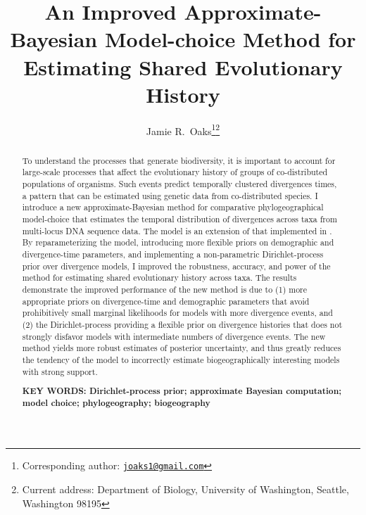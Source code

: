 \documentclass[letterpaper,12pt]{article}
\title{An Improved Approximate-Bayesian Model-choice Method for Estimating
Shared Evolutionary History}
\author[1]{Jamie R.\ Oaks\thanks{Corresponding author: \href{mailto:joaks1@gmail.com}{\tt joaks1@gmail.com}}\thanks{Current address: Department of Biology, University of Washington, Seattle, Washington 98195}}
\affil[1]{Department of Ecology and Evolutionary Biology, University of Kansas, Lawrence, Kansas 66045}
\date{\parbox{\linewidth}{\centering%
    \today\endgraf\bigskip
    \textbf{Running head}: Improved Estimation of Shared Evolutionary History}}
\begin{document}

\maketitle

\begin{abstract}
    To understand the processes that generate biodiversity, it is
    important to account for large-scale processes that affect the evolutionary
    history of groups of co-distributed populations of organisms.
    Such events predict temporally clustered divergences times, a pattern
    that can be estimated using genetic data from co-distributed species.
    I introduce a new approximate-Bayesian method for comparative
    phylogeographical model-choice that estimates the temporal distribution of
    divergences across taxa from multi-locus DNA sequence data.
    The model is an extension of that implemented in \msb.
    By reparameterizing the model, introducing more flexible priors on
    demographic and divergence-time parameters, and implementing a
    non-parametric Dirichlet-process prior over divergence models, I improved
    the robustness, accuracy, and power of the method for estimating shared
    evolutionary history across taxa.
    The results demonstrate the improved performance of the new method is due
    to (1) more appropriate priors on divergence-time and demographic
    parameters that avoid prohibitively small marginal likelihoods for models
    with more divergence events,
    and (2) the Dirichlet-process providing a flexible prior on divergence
    histories that does not strongly disfavor models with intermediate numbers
    of divergence events.
    The new method yields more robust estimates of posterior uncertainty, and
    thus greatly reduces the tendency of the model to incorrectly estimate
    biogeographically interesting models with strong support.

    \vspace{12pt}
    \noindent\textbf{KEY WORDS: Dirichlet-process prior; approximate Bayesian
    computation; model choice; phylogeography; biogeography} 
\end{abstract}
\end{document}
